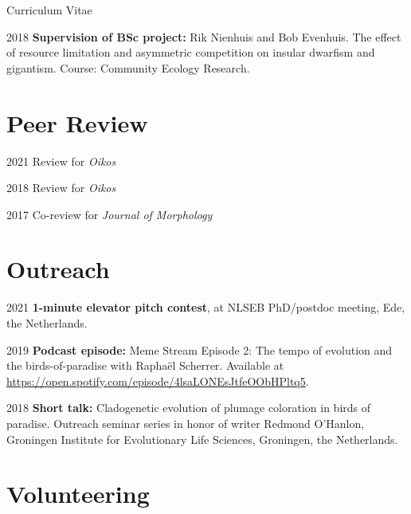 \documentclass[11pt,a4paper]{article}
\begin{document}
\begin{cv}{Curriculum Vitae}
\begin{cvlist}{}
			\item[2018] \textbf{Supervision of BSc project:} Rik Nienhuis and Bob Evenhuis. The effect of resource limitation and asymmetric competition on insular dwarfism and gigantism. Course: Community Ecology Research.		
			
		\end{cvlist}
		
		\section{Peer Review}
		
		\begin{cvlist}{}
		\item[2021] Review for \textit{Oikos}
		\item[2018] Review for \textit{Oikos}
		\item[2017] Co-review for \textit{Journal of Morphology}
		\end{cvlist}
		
		\section{Outreach}
		
		\begin{cvlist}{}
			
			\item[2021] \textbf{1-minute elevator pitch contest}, at NLSEB PhD/postdoc meeting, Ede, the Netherlands.
			
			\item[2019] \textbf{Podcast episode:} Meme Stream Episode 2: The tempo of evolution and the birds-of-paradise with Raphaël Scherrer. Available at \url{https://open.spotify.com/episode/4lsaLONEsJtfeOObHPltq5}.
			
			\item[2018] \textbf{Short talk:} Cladogenetic evolution of plumage coloration in birds of paradise. Outreach seminar series in honor of writer Redmond O'Hanlon, Groningen Institute for Evolutionary Life Sciences, Groningen, the Netherlands.
	
		\end{cvlist}
		
		\section{Volunteering}
		
		\begin{cvlist}{}
		

\end{cvlist}
\end{cv}
\end{document}

